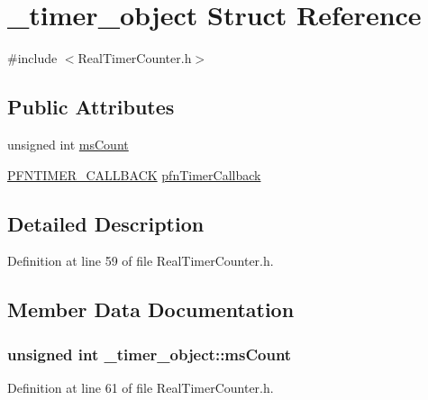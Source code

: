 \hypertarget{struct__timer__object}{}\section{\+\_\+timer\+\_\+object Struct Reference}
\label{struct__timer__object}


{\ttfamily \#include $<$Real\+Timer\+Counter.\+h$>$}

\subsection*{Public Attributes}
\begin{DoxyCompactItemize}
\item 
unsigned int \hyperlink{struct__timer__object_a16913fdb2e57a08c59829051c2ca542f}{ms\+Count}
\item 
\hyperlink{_real_timer_counter_8h_a1675902256988bafd15248f7b370084c}{P\+F\+N\+T\+I\+M\+E\+R\+\_\+\+C\+A\+L\+L\+B\+A\+CK} \hyperlink{struct__timer__object_a32dd3c990468be61b1959f1f7a2ad778}{pfn\+Timer\+Callback}
\end{DoxyCompactItemize}


\subsection{Detailed Description}


Definition at line 59 of file Real\+Timer\+Counter.\+h.



\subsection{Member Data Documentation}
\subsubsection[{\texorpdfstring{ms\+Count}{msCount}}]{\setlength{\rightskip}{0pt plus 5cm}unsigned int \+\_\+timer\+\_\+object\+::ms\+Count}\hypertarget{struct__timer__object_a16913fdb2e57a08c59829051c2ca542f}{}\label{struct__timer__object_a16913fdb2e57a08c59829051c2ca542f}


Definition at line 61 of file Real\+Timer\+Counter.\+h.

